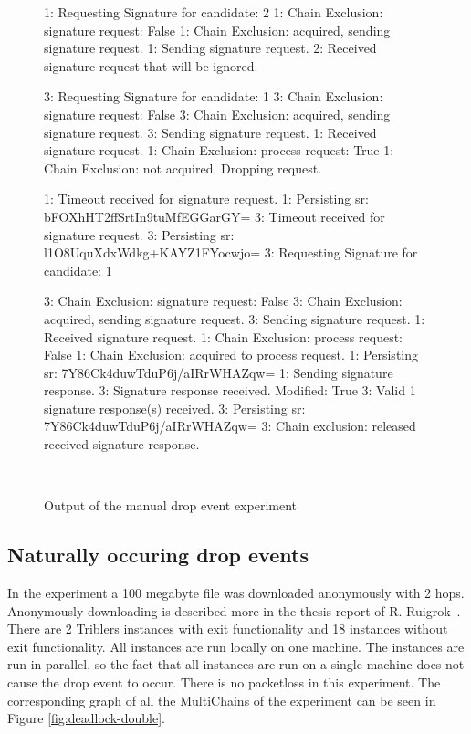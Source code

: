 \begin{figure}
\begin{FVerbatim}[fontsize=\small]
1: Requesting Signature for candidate: 2
1: Chain Exclusion: signature request: False
1: Chain Exclusion: acquired, sending signature request.
1: Sending signature request.
2: Received signature request that will be ignored.

3: Requesting Signature for candidate: 1
3: Chain Exclusion: signature request: False
3: Chain Exclusion: acquired, sending signature request.
3: Sending signature request.
1: Received signature request.
1: Chain Exclusion: process request: True
1: Chain Exclusion: not acquired. Dropping request.

1: Timeout received for signature request.
1: Persisting sr: bFOXhHT2ffSrtIn9tuMfEGGarGY=
3: Timeout received for signature request.
3: Persisting sr: l1O8UquXdxWdkg+KAYZ1FYocwjo=
3: Requesting Signature for candidate: 1

3: Chain Exclusion: signature request: False
3: Chain Exclusion: acquired, sending signature request.
3: Sending signature request.
1: Received signature request.
1: Chain Exclusion: process request: False
1: Chain Exclusion: acquired to process request.
1: Persisting sr: 7Y86Ck4duwTduP6j/aIRrWHAZqw=
1: Sending signature response.
3: Signature response received. Modified: True
3: Valid 1 signature response(s) received.
3: Persisting sr: 7Y86Ck4duwTduP6j/aIRrWHAZqw=
3: Chain exclusion: released received signature response.
\end{FVerbatim}
    \caption{Output of the manual drop event experiment}~\label{fig:manual-deadlock-experiment}
\end{figure}

\subsection{Naturally occuring drop events}
In the experiment a 100 megabyte file was downloaded anonymously with 2 hops.
Anonymously downloading is described more in the thesis report of R. Ruigrok~\cite{ruigrok-anonymous}.
There are 2 Triblers instances with exit functionality and 18 instances without exit functionality.
All instances are run locally on one machine.
The instances are run in parallel,
so the fact that all instances are run on a single machine does not cause the drop event to occur.
There is no packetloss in this experiment.
The corresponding graph of all the MultiChains of the experiment can be seen in Figure \ref{fig:deadlock-double}.


